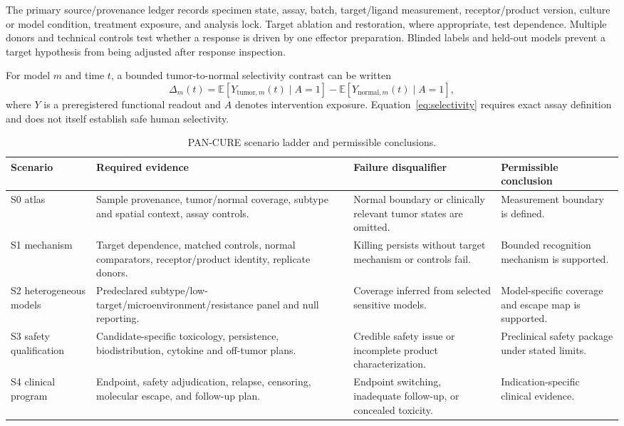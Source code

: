 \documentclass[10pt,conference]{IEEEtran}
\begin{document}
The primary source/provenance ledger records specimen state, assay, batch, target/ligand measurement, receptor/product version, culture or model condition, treatment exposure, and analysis lock. Target ablation and restoration, where appropriate, test dependence. Multiple donors and technical controls test whether a response is driven by one effector preparation. Blinded labels and held-out models prevent a target hypothesis from being adjusted after response inspection.

For model $m$ and time $t$, a bounded tumor-to-normal selectivity contrast can be written
\begin{equation}
\Delta_{m}(t)=\mathbb{E}[Y_{\mathrm{tumor},m}(t)\mid A=1]-\mathbb{E}[Y_{\mathrm{normal},m}(t)\mid A=1],\label{eq:selectivity}
\end{equation}
where $Y$ is a preregistered functional readout and $A$ denotes intervention exposure. Equation~\eqref{eq:selectivity} requires exact assay definition and does not itself establish safe human selectivity.

\begin{table}[!t]\caption{PAN-CURE scenario ladder and permissible conclusions.}\label{tab:ladder}\centering\footnotesize
\begin{tabular}{@{}p{}p{}p{}p{}@{}}\toprule
Scenario & Required evidence & Failure disqualifier & Permissible conclusion\\\midrule
S0 atlas & Sample provenance, tumor/normal coverage, subtype and spatial context, assay controls. & Normal boundary or clinically relevant tumor states are omitted. & Measurement boundary is defined.\\
S1 mechanism & Target dependence, matched controls, normal comparators, receptor/product identity, replicate donors. & Killing persists without target mechanism or controls fail. & Bounded recognition mechanism is supported.\\
S2 heterogeneous models & Predeclared subtype/low-target/microenvironment/resistance panel and null reporting. & Coverage inferred from selected sensitive models. & Model-specific coverage and escape map is supported.\\
S3 safety qualification & Candidate-specific toxicology, persistence, biodistribution, cytokine and off-tumor plans. & Credible safety issue or incomplete product characterization. & Preclinical safety package under stated limits.\\
S4 clinical program & Endpoint, safety adjudication, relapse, censoring, molecular escape, and follow-up plan. & Endpoint switching, inadequate follow-up, or concealed toxicity. & Indication-specific clinical evidence.\\\bottomrule\end{tabular}\end{table}
\end{document}
